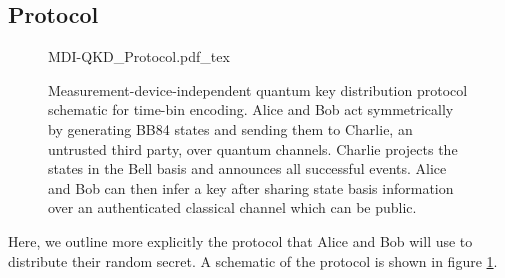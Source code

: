 \subsection{Protocol}

\begin{figure}[tp]
	\centering
	\small
	\def\svgwidth{\textwidth} 
	{MDI-QKD_Protocol.pdf_tex}
	\caption[Measure-device-independent quantum key distribution time-bin encoded protocol]{Measurement-device-independent quantum key distribution protocol schematic for time-bin encoding. Alice and Bob act symmetrically by generating BB84 states and sending them to Charlie, an untrusted third party, over quantum channels. Charlie projects the states in the Bell basis and announces all successful events. Alice and Bob can then infer a key after sharing state basis information over an authenticated classical channel which can be public.}
	\label{fig:mdi_protocol}
\end{figure}

Here, we outline more explicitly the protocol that Alice and Bob will use to distribute their random secret. A schematic of the protocol is shown in figure \ref{fig:mdi_protocol}. 


